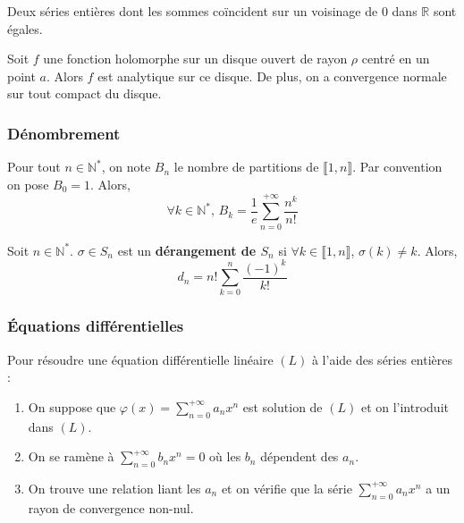   \begin{corollary}
    Deux séries entières dont les sommes coïncident sur un voisinage de $0$ dans $\mathbb{R}$ sont égales.
  \end{corollary}


  \begin{theorem}
    Soit $f$ une fonction holomorphe sur un disque ouvert de rayon $\rho$ centré en un point $a$. Alors $f$ est analytique sur ce disque.
    De plus, on a convergence normale sur tout compact du disque.
  \end{theorem}

  \subsubsection{Dénombrement}


  \begin{application}
    Pour tout $n \in \mathbb{N}^*$, on note $B_n$ le nombre de partitions de $\llbracket 1, n \rrbracket$. Par convention on pose $B_0 = 1$. Alors,
    \[ \forall k \in \mathbb{N}^*, \, B_k = \frac{1}{e} \sum_{n=0}^{+\infty} \frac{n^k}{n!} \]
  \end{application}


  \begin{application}
    Soit $n \in \mathbb{N}^*$. $\sigma \in S_n$ est un \textbf{dérangement de $S_n$} si $\forall k \in \llbracket 1, n \rrbracket$, $\sigma(k) \neq k$.
    Alors,
    \[ d_n = n! \sum_{k=0}^n \frac{(-1)^k}{k!} \]
  \end{application}

  \subsubsection{Équations différentielles}


  \begin{proposition}
    Pour résoudre une équation différentielle linéaire $(L)$ à l'aide des séries entières :
    \begin{enumerate}[label=(\roman*)]
      \item On suppose que $\varphi(x) = \sum_{n=0}^{+\infty} a_n x^n$ est solution de $(L)$ et on l'introduit dans $(L)$.
      \item On se ramène à $\sum_{n=0}^{+\infty} b_nx^n = 0$ où les $b_n$ dépendent des $a_n$.
      \item On trouve une relation liant les $a_n$ et on vérifie que la série $\sum_{n=0}^{+\infty} a_n x^n$ a un rayon de convergence non-nul.
    \end{enumerate}
  \end{proposition}


